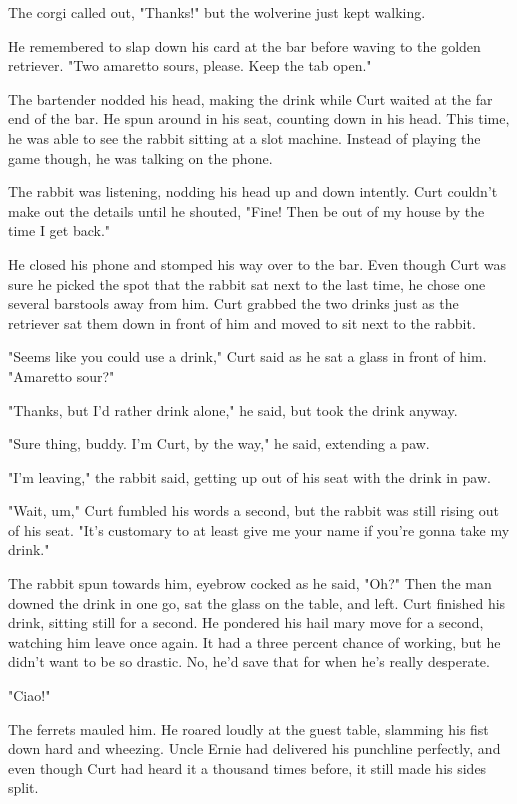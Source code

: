 The corgi called out, "Thanks!" but the wolverine just kept walking.

He remembered to slap down his card at the bar before waving to the golden retriever. "Two amaretto sours, please. Keep the tab open."

The bartender nodded his head, making the drink while Curt waited at the far end of the bar. He spun around in his seat, counting down in his head. This time, he was able to see the rabbit sitting at a slot machine. Instead of playing the game though, he was talking on the phone.

The rabbit was listening, nodding his head up and down intently. Curt couldn't make out the details until he shouted, "Fine! Then be out of my house by the time I get back."

He closed his phone and stomped his way over to the bar. Even though Curt was sure he picked the spot that the rabbit sat next to the last time, he chose one several barstools away from him. Curt grabbed the two drinks just as the retriever sat them down in front of him and moved to sit next to the rabbit.

"Seems like you could use a drink," Curt said as he sat a glass in front of him. "Amaretto sour?"

"Thanks, but I'd rather drink alone," he said, but took the drink anyway.

"Sure thing, buddy. I'm Curt, by the way," he said, extending a paw.

"I'm leaving," the rabbit said, getting up out of his seat with the drink in paw.

"Wait, um," Curt fumbled his words a second, but the rabbit was still rising out of his seat. "It's customary to at least give me your name if you're gonna take my drink."

The rabbit spun towards him, eyebrow cocked as he said, "Oh?" Then the man downed the drink in one go, sat the glass on the table, and left. Curt finished his drink, sitting still for a second. He pondered his hail mary move for a second, watching him leave once again. It had a three percent chance of working, but he didn't want to be so drastic. No, he'd save that for when he's really desperate.

"Ciao!"

The ferrets mauled him. He roared loudly at the guest table, slamming his fist down hard and wheezing. Uncle Ernie had delivered his punchline perfectly, and even though Curt had heard it a thousand times before, it still made his sides split.

